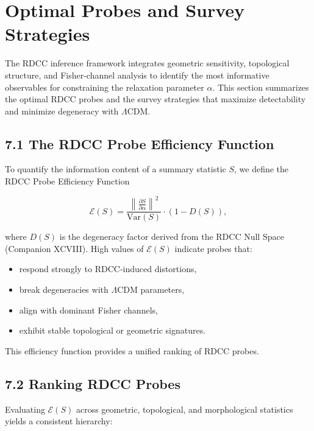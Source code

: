\documentclass[11pt,a4paper]{article}
\begin{document}
\section{Optimal Probes and Survey Strategies}

The RDCC inference framework integrates geometric sensitivity, topological 
structure, and Fisher-channel analysis to identify the most informative 
observables for constraining the relaxation parameter $\alpha$. This section 
summarizes the optimal RDCC probes and the survey strategies that maximize 
detectability and minimize degeneracy with $\Lambda$CDM.

\subsection*{7.1 The RDCC Probe Efficiency Function}

To quantify the information content of a summary statistic $S$, we define the 
RDCC Probe Efficiency Function


\[
    \mathcal{E}(S)
    =
    \frac{
        \left\|
            \frac{\partial S}{\partial \alpha}
        \right\|^{2}
    }{
        \mathrm{Var}(S)
    }
    \cdot
    \left(
        1 - D(S)
    \right),
\]


where $D(S)$ is the degeneracy factor derived from the RDCC Null Space 
(Companion XCVIII). High values of $\mathcal{E}(S)$ indicate probes that:

\begin{itemize}
    \item respond strongly to RDCC-induced distortions,
    \item break degeneracies with $\Lambda$CDM parameters,
    \item align with dominant Fisher channels,
    \item exhibit stable topological or geometric signatures.
\end{itemize}

This efficiency function provides a unified ranking of RDCC probes.

\subsection*{7.2 Ranking RDCC Probes}

Evaluating $\mathcal{E}(S)$ across geometric, topological, and morphological 
statistics yields a consistent hierarchy:
\end{document}
